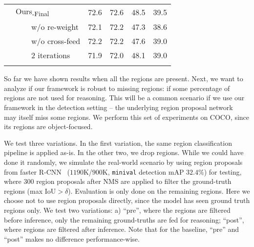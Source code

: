 \documentclass[10pt,twocolumn,letterpaper]{article}
\begin{document}
\begin{table}[t]
{\begin{tabular}{@{} C{0.5cm} !{\vrule} L{2.5cm} !{\vrule} x{1.2cm} x{1.2cm} !{\vrule} x{1.2cm} x{1.2cm} @{}}
\Xhline{0.5pt}
\parbox[t]{2.5mm}{} & Ours\textsubscript{-Final} & 72.6 & 72.6 & 48.5 & 39.5 \\
& ~~~~{\small w/o re-weight} & 72.1 & 72.2 & 47.3 & 38.6 \\
& ~~~~{\small w/o cross-feed} & 72.2 & 72.2 & 47.6 & 39.0 \\
& ~~~~{\small $2$ iterations} & 71.9 & 72.0 & 48.1 & 39.0 \\

\Xhline{1pt}
\end{tabular}
}
\vspace{-0.1in}
\end{table}

 So far we have shown results when all the regions are present. Next, we want to analyze if our framework is robust to missing regions: if some percentage of regions are not used for reasoning. This will be a common scenario if we use our framework in the detection setting -- the underlying region proposal network~\cite{ren2015faster} may itself miss some regions. We perform this set of experiments on COCO, since its regions are object-focused.

We test three variations. In the first variation, the same region classification pipeline is applied as-is. In the other two, we drop regions. While we could have done it randomly, we simulate the real-world scenario by using region proposals from faster R-CNN~\cite{ren2015faster} ($1190$K/$900$K, {\tt minival} detection mAP $32.4\%$) for testing, where $300$ region proposals after NMS are applied to filter the ground-truth regions (max IoU${>}\delta$). Evaluation is only done on the remaining regions. Here we choose not to use region proposals directly, since the model has seen ground truth regions only. We test two variations: a) ``pre'', where the regions are filtered before inference, \ie only the remaining ground-truths are fed for reasoning; ``post'', where regions are filtered after inference. Note that for the baseline, ``pre'' and ``post'' makes no difference performance-wise.
\end{document}

